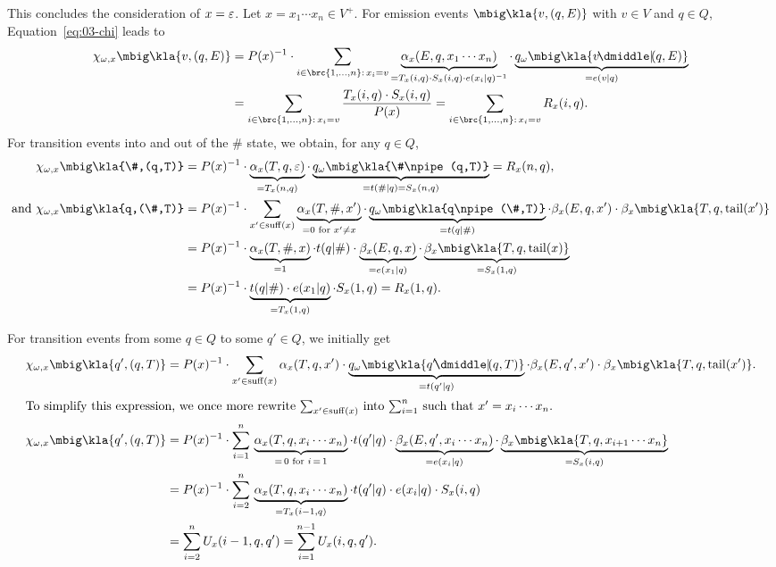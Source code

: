 This concludes the consideration of $x=\varepsilon$. Let $x=x_1\cdots x_n\in V^+$. For emission events
$\mbig\kla{v,(q,E)}$ with $v\in V$ and $q\in Q$, Equation~\eqref{eq:03-chi} leads to
\begin{align*}
 \chi_{\omega,x}\mbig\kla{v,(q,E)}
 &= P(x)^{-1} \cdot \sum_{i\in\brc{1,\ldots,n}:\, x_i=v} \underbrace{\alpha_x(E,q,x_1\cdots x_n)}_{=T_x(i,q)\cdot S_x(i,q)\cdot e(x_i|q)^{-1}} \cdot \underbrace{q_\omega\mbig\kla{v\npipe(q,E)}}_{=e(v|q)} \\
 &= \sum_{i\in\brc{1,\ldots,n}:\, x_i=v} \frac{T_x(i,q)\cdot S_x(i,q)}{P(x)}
  = \sum_{i\in\brc{1,\ldots,n}:\, x_i=v} R_x(i,q).
\end{align*}
For transition events into and out of the $\#$ state, we obtain, for any $q\in Q$,
\begin{align*}
 \chi_{\omega,x}\mbig\kla{\#,(q,T)}
 &= P(x)^{-1} \cdot \underbrace{\alpha_x(T,q,\eps)}_{=T_x(n,q)} \cdot \underbrace{q_\omega\mbig\kla{\#\npipe(q,T)}}_{=t(\#|q)=S_x(n,q)} = R_x(n,q), \\
 \text{and } \chi_{\omega,x}\mbig\kla{q,(\#,T)}
 &= P(x)^{-1} \cdot \sum_{x'\in\suff(x)} \underbrace{\alpha_x(T,\#,x')}_{=0\text{ for }x'\neq x} \cdot \underbrace{q_\omega\mbig\kla{q\npipe(\#,T)}}_{=t(q|\#)} \cdot \beta_x(E,q,x') \cdot \beta_x\mbig\kla{T,q,\cdr(x')} \\
 &= P(x)^{-1} \cdot \underbrace{\alpha_x(T,\#,x)}_{=1} \cdot t(q|\#) \cdot \underbrace{\beta_x(E,q,x)}_{=e(x_1|q)} \cdot \underbrace{\beta_x\mbig\kla{T,q,\cdr(x)}}_{=S_x(1,q)} \\
 &= P(x)^{-1} \cdot \underbrace{t(q|\#) \cdot e(x_1|q)}_{=T_x(1,q)} \cdot S_x(1,q)
  = R_x(1,q).
\end{align*}

For transition events from some $q\in Q$ to some $q'\in Q$, we initially get
\begin{align*}
 \chi_{\omega,x}\mbig\kla{q',(q,T)}
 &= P(x)^{-1} \cdot \sum_{x'\in\suff(x)} \alpha_x(T,q,x') \cdot \underbrace{q_\omega\mbig\kla{q'\npipe(q,T)}}_{=t(q'|q)} \cdot \beta_x(E,q',x') \cdot \beta_x\mbig\kla{T,q,\cdr(x')}. \\
 \intertext{To simplify this expression, we once more rewrite $\sum_{x'\in\suff(x)}$ into $\sum_{i=1}^n$ such that $x' = x_i\cdots x_n$.}
 \chi_{\omega,x}\mbig\kla{q',(q,T)}
 &= P(x)^{-1} \cdot \sum_{i=1}^n \,\underbrace{\alpha_x(T,q,x_i\cdots x_n)}_{=\,0\text{ for }i\,=\,1} \cdot t(q'|q) \cdot \underbrace{\beta_x(E,q',x_i\cdots x_n)}_{=e(x_i|q)} \cdot \underbrace{\beta_x\mbig\kla{T,q,x_{i+1}\cdots x_n}}_{=S_x(i,q)} \\
 &= P(x)^{-1} \cdot \sum_{i=2}^n \,\underbrace{\alpha_x(T,q,x_i\cdots x_n)}_{=T_x(i-1,q)} \cdot t(q'|q) \cdot e(x_i|q) \cdot S_x(i,q) \\
 &= \sum_{i=2}^n U_x(i-1,q,q') = \sum_{i=1}^{n-1} U_x(i,q,q').
\end{align*}

